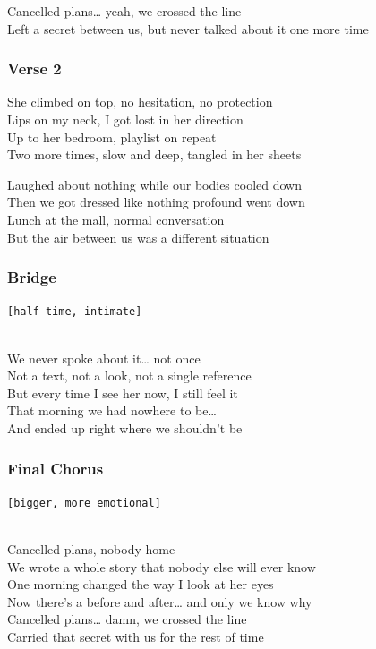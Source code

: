 Cancelled plans\ldots{} yeah, we crossed the line\\
Left a secret between us, but never talked about it one more time

\subsubsection{Verse 2}\label{verse-2-28}

She climbed on top, no hesitation, no protection\\
Lips on my neck, I got lost in her direction\\
Up to her bedroom, playlist on repeat\\
Two more times, slow and deep, tangled in her sheets

Laughed about nothing while our bodies cooled down\\
Then we got dressed like nothing profound went down\\
Lunch at the mall, normal conversation\\
But the air between us was a different situation

\subsubsection{Bridge}\label{bridge-29}

\texttt{{[}half-time,\ intimate{]}}\strut \\
We never spoke about it\ldots{} not once\\
Not a text, not a look, not a single reference\\
But every time I see her now, I still feel it\\
That morning we had nowhere to be\ldots{}\\
And ended up right where we shouldn't be

\subsubsection{Final Chorus}\label{final-chorus-6}

\texttt{{[}bigger,\ more\ emotional{]}}\strut \\
Cancelled plans, nobody home\\
We wrote a whole story that nobody else will ever know\\
One morning changed the way I look at her eyes\\
Now there's a before and after\ldots{} and only we know why\\
Cancelled plans\ldots{} damn, we crossed the line\\
Carried that secret with us for the rest of time

